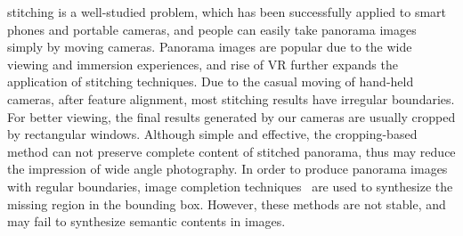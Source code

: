 \documentclass[10pt,journal,compsoc]{IEEEtran}
\begin{document}
\maketitle


\IEEEdisplaynontitleabstractindextext

\IEEEpeerreviewmaketitle



 stitching is a well-studied problem, which has been successfully applied to smart phones and portable cameras, and people can easily take panorama images simply by moving cameras.
Panorama images are popular due to the wide viewing and immersion experiences, and rise of VR further expands the application of stitching techniques.
Due to the casual moving of hand-held cameras, after feature alignment, most stitching results have irregular boundaries. For better viewing, the final results generated by our cameras are usually cropped by rectangular windows.
Although simple and effective, the cropping-based method can not preserve complete content of stitched panorama, thus may reduce the impression of wide angle photography.
In order to produce panorama images with regular boundaries, image completion techniques~\cite{journals/mta/YenYC17,journals/tog/BarnesSFG09} are used to synthesize the missing region in the bounding box. However, these methods are not stable, and may fail to synthesize semantic contents in images.
\end{document}
